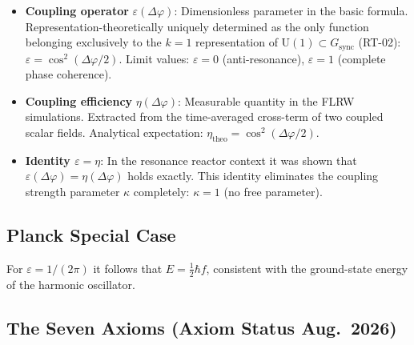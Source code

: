 \documentclass[a4paper,11pt]{article}
\begin{document}
	\begin{itemize}
		\item \textbf{Coupling operator}
		$\varepsilon(\Delta\varphi)$:
		Dimensionless parameter in the basic formula.
		Representation-theoretically uniquely determined as the only function
		belonging exclusively to the $k{=}1$ representation of
		$\mathrm{U}(1) \subset G_{\mathrm{sync}}$ (RT-02):
		$\varepsilon = \cos^2(\Delta\varphi/2)$.
		Limit values: $\varepsilon = 0$ (anti-resonance),
		$\varepsilon = 1$ (complete phase coherence).
		\item \textbf{Coupling efficiency}
		$\eta(\Delta\varphi)$:
		Measurable quantity in the FLRW simulations. Extracted from the
		time-averaged cross-term of two coupled scalar fields.
		Analytical expectation:
		$\eta_{\mathrm{theo}} = \cos^2(\Delta\varphi/2)$.
		\item \textbf{Identity $\varepsilon = \eta$}:
		In the resonance reactor context it was shown that
		$\varepsilon(\Delta\varphi) = \eta(\Delta\varphi)$
		holds exactly.
		This identity eliminates the coupling strength parameter
		$\kappa$ completely:
		$\kappa = 1$ (no free parameter).
	\end{itemize}
	
	\subsection{Planck Special Case}
	
	For $\varepsilon = 1/(2\pi)$ it follows that
	$E = \frac{1}{2}\hbar f$, consistent with the
	ground-state energy of the harmonic oscillator.
	
	\subsection{The Seven Axioms (Axiom Status Aug.\ 2026)}
	
\end{document}
